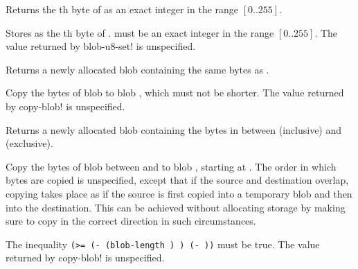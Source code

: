 \begin{entry}{%
}

Returns the th byte of  as an exact integer in the
range $[0..255]$.
\end{entry}

\begin{entry}{%
}

Stores  as the th byte of .   must be
an exact integer in the range $[0..255]$.  The value returned by
{\cf blob-u8-set!} is unspecified.
\end{entry}

\begin{entry}{%
}

Returns a newly allocated blob containing the same bytes as
.
\end{entry}

\begin{entry}{%
}

Copy the bytes of blob  to blob , which must not be
shorter.  The value returned by {\cf copy-blob!} is unspecified.
\end{entry}

\begin{entry}{%
}

Returns a newly allocated blob containing the bytes in 
between  (inclusive) and 
(exclusive).
\end{entry}

\begin{entry}{%
}

Copy the bytes of blob  between  and 
to blob , starting at .  The order in which bytes are
copied is unspecified, except that if the source and destination overlap,
copying takes place as if the source is first copied into a temporary
blob and then into the destination.  This can be achieved without
allocating storage by making sure to copy in the correct direction in
such circumstances.

The inequality
\texttt{({\cf >=} ({\cf -} ({\cf blob-length} ) ) ({\cf -}  ))}
must be true.  The value returned by {\cf copy-blob!} is unspecified.
\end{entry}


